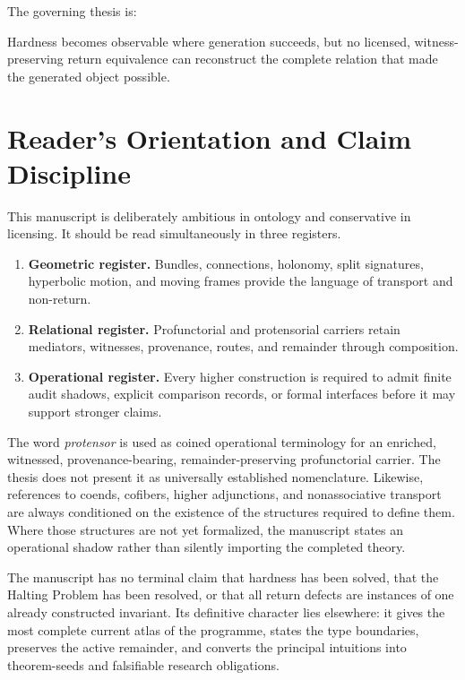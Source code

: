 \documentclass[12pt,openany]{book}
\theoremstyle{remark}
\begin{document}
The governing thesis is:
\begin{invariantbox}
Hardness becomes observable where generation succeeds, but no licensed, witness-preserving return equivalence can reconstruct the complete relation that made the generated object possible.
\end{invariantbox}

\chapter*{Reader's Orientation and Claim Discipline}
This manuscript is deliberately ambitious in ontology and conservative in licensing. It should be read simultaneously in three registers.

\begin{enumerate}
\item \textbf{Geometric register.} Bundles, connections, holonomy, split signatures, hyperbolic motion, and moving frames provide the language of transport and non-return.
\item \textbf{Relational register.} Profunctorial and protensorial carriers retain mediators, witnesses, provenance, routes, and remainder through composition.
\item \textbf{Operational register.} Every higher construction is required to admit finite audit shadows, explicit comparison records, or formal interfaces before it may support stronger claims.
\end{enumerate}

The word \emph{protensor} is used as coined operational terminology for an enriched, witnessed, provenance-bearing, remainder-preserving profunctorial carrier. The thesis does not present it as universally established nomenclature. Likewise, references to coends, cofibers, higher adjunctions, and nonassociative transport are always conditioned on the existence of the structures required to define them. Where those structures are not yet formalized, the manuscript states an operational shadow rather than silently importing the completed theory.

The manuscript has no terminal claim that hardness has been solved, that the Halting Problem has been resolved, or that all return defects are instances of one already constructed invariant. Its definitive character lies elsewhere: it gives the most complete current atlas of the programme, states the type boundaries, preserves the active remainder, and converts the principal intuitions into theorem-seeds and falsifiable research obligations.
\end{document}
